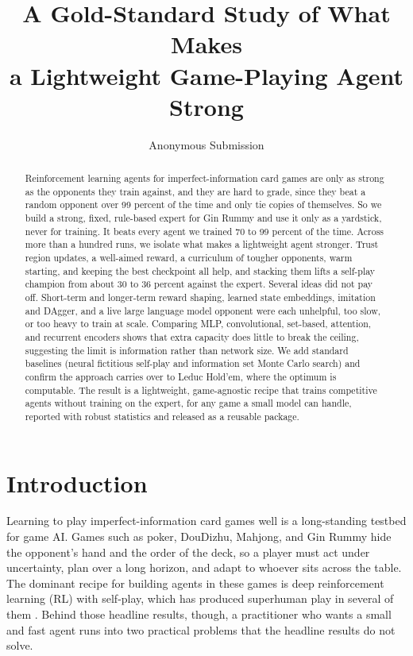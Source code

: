 \documentclass[letterpaper]{article} %
\title{A Gold-Standard Study of What Makes\\
a Lightweight Game-Playing Agent Strong}
\author{Anonymous Submission}
\begin{document}
\maketitle

\begin{abstract}
\noindent
Reinforcement learning agents for imperfect-information card games are only as
strong as the opponents they train against, and they are hard to grade, since they
beat a random opponent over 99 percent of the time and only tie copies of
themselves. So we build a strong, fixed, rule-based expert for Gin Rummy and use
it only as a yardstick, never for training. It beats every agent we trained 70 to
99 percent of the time. Across more than a hundred runs, we isolate what makes a
lightweight agent stronger. Trust region updates, a well-aimed reward, a curriculum
of tougher opponents, warm starting, and keeping the best checkpoint all help, and
stacking them lifts a self-play champion from about 30 to 36 percent against the
expert. Several ideas did not pay off. Short-term and longer-term reward shaping,
learned state embeddings, imitation and DAgger, and a live large language model
opponent were each unhelpful, too slow, or too heavy to train at scale. Comparing
MLP, convolutional, set-based, attention, and recurrent encoders shows that extra
capacity does little to break the ceiling, suggesting the limit is information
rather than network size. We add standard baselines (neural fictitious self-play
and information set Monte Carlo search) and confirm the approach carries over to
Leduc Hold'em, where the optimum is computable. The result is a lightweight,
game-agnostic recipe that trains competitive agents without training on the expert,
for any game a small model can handle, reported with robust statistics and released
as a reusable package.
\end{abstract}

\section{Introduction}
Learning to play imperfect-information card games well is a long-standing
testbed for game AI. Games such as poker, DouDizhu, Mahjong, and Gin Rummy hide
the opponent's hand and the order of the deck, so a player must act under
uncertainty, plan over a long horizon, and adapt to whoever sits across the
table. The dominant recipe for building agents in these games is deep
reinforcement learning (RL) with self-play, which has produced superhuman play
in several of them \citep{nfsp,suphx,douzero}. Behind those headline results,
though, a practitioner who wants a small and fast agent runs into two practical
problems that the headline results do not solve.
\end{document}
